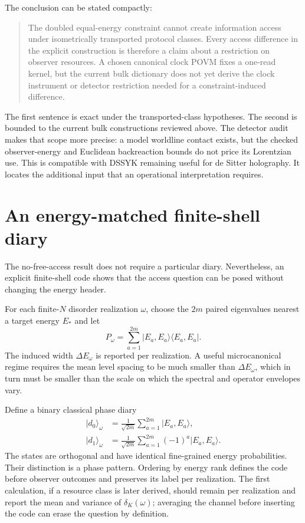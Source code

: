 \documentclass[11pt]{article}
\begin{document}
The conclusion can be stated compactly:
\begin{quote}
The doubled equal-energy constraint cannot create information access under
isometrically transported protocol classes.  Every access difference in the
explicit construction is therefore a claim about a restriction on observer
resources.  A chosen canonical clock POVM fixes a one-read kernel, but the
current bulk dictionary does not yet derive the clock instrument or detector
restriction needed for a constraint-induced difference.
\end{quote}
The first sentence is exact under the transported-class hypotheses.  The
second is bounded to the current bulk constructions reviewed above.
The detector audit makes that scope more precise: a model worldline contact
exists, but the checked observer-energy and Euclidean backreaction bounds do
not price its Lorentzian use.
This is compatible with DSSYK remaining useful for de Sitter holography.  It
locates the additional input that an operational interpretation requires.

\appendix

\section{An energy-matched finite-shell diary}
\label{app:shell}

The no-free-access result does not require a particular diary.  Nevertheless,
an explicit finite-shell code shows that the access question can be posed
without changing the energy header.

For each finite-$N$ disorder realization $\omega$, choose the $2m$ paired
eigenvalues nearest a target energy $E_*$ and let
\begin{equation}
  P_\omega
  =\sum_{a=1}^{2m}|E_a,E_a\rangle\langle E_a,E_a|.
  \label{eq:shellprojector}
\end{equation}
The induced width $\Delta E_\omega$ is reported per realization.  A useful
microcanonical regime requires the mean level spacing to be much smaller than
$\Delta E_\omega$, which in turn must be smaller than the scale on which the
spectral and operator envelopes vary.

Define a binary classical phase diary
\begin{align}
  |d_0\rangle_\omega
    &=\frac{1}{\sqrt{2m}}\sum_{a=1}^{2m}|E_a,E_a\rangle,
    \nonumber\\
  |d_1\rangle_\omega
    &=\frac{1}{\sqrt{2m}}\sum_{a=1}^{2m}(-1)^a
      |E_a,E_a\rangle.
  \label{eq:phasecode}
\end{align}
The states are orthogonal and have identical fine-grained energy
probabilities.  Their distinction is a phase pattern.  Ordering by energy
rank defines the code before observer outcomes and preserves its label per
realization.  The first calculation, if a resource class is later derived,
should remain per realization and report the mean and variance of
$\delta_K(\omega)$; averaging the channel before inserting the code can erase
the question by definition.
\end{document}
